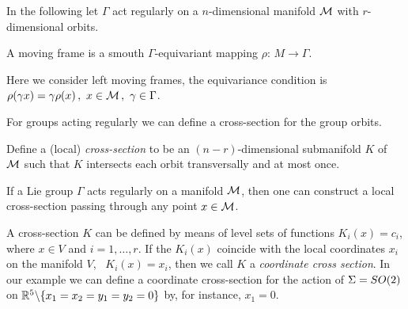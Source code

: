 In the following let $\Gamma$ act regularly on a $n$-dimensional manifold $\mathcal{M}$ with $r$-dimensional orbits.
\begin{definition}
 A moving frame is a smouth $\Gamma$-equivariant mapping $\rho:\,M \rightarrow \Gamma$. 
\end{definition}
Here we consider left moving frames, \ie the equivariance condition is $\rho(\gamma x)=\gamma\rho(x)\,,\ x\in\Manif\,,\ \gamma\in\Gamma$.

For groups acting regularly we can define a cross-section for the group orbits.

\begin{definition}
\label{def:cross-section}
Define a (local) \emph{cross-section}
to be an $(n-r)$-dimensional submanifold $K$ of $\mathcal{M}$ such that $K$ intersects each orbit transversally and at most once.
\end{definition}


\begin{proposition}
 If a Lie group $\Gamma$ acts regularly on a manifold $\mathcal{M}$, then one can construct a local cross-section
 passing through any point $x\in \mathcal{M}$.
\end{proposition}

A cross-section $K$ can be defined by means of level sets of functions $K_i(x)=c_i$,
where $x\in V$ and $i=1,\ldots,r$. If the $K_i(x)$
coincide with the local coordinates $x_i$ on the manifold $V$, \ie~$K_i(x)=x_i$,
then we call $K$ a \emph{coordinate cross
section}. In our example we can define a coordinate cross-section for the action of
$\Sigma=SO(2)$ on $\mathbb{R}^{5}\backslash\{x_1=x_2=y_1=y_2=0\}$  by, for instance, $x_1=0$.

